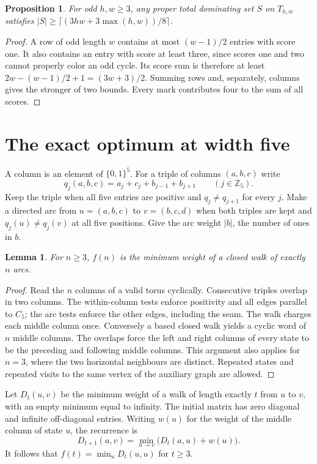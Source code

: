 \documentclass[11pt,a4paper]{article}
\newtheorem{lemma}[theorem]{Lemma}
\newtheorem{proposition}[theorem]{Proposition}
\newcommand{\T}{T}
\begin{document}
\begin{proposition}
For odd $h,w\ge3$, any proper total dominating set $S$ on $\T_{h,w}$ satisfies
$|S|\ge \lceil(3hw+3\max(h,w))/8\rceil$.
\end{proposition}
\begin{proof}
A row of odd length $w$ contains at most $(w-1)/2$ entries with score one. It also contains an entry with score at least three, since scores one and two cannot properly color an odd cycle. Its score sum is therefore at least $2w-(w-1)/2+1=(3w+3)/2$. Summing rows and, separately, columns gives the stronger of two bounds. Every mark contributes four to the sum of all scores.
\end{proof}

\clearpage
\section{The exact optimum at width five}
A column is an element of $\{0,1\}^5$. For a triple of columns $(a,b,c)$ write
\[
 q_j(a,b,c)=a_j+c_j+b_{j-1}+b_{j+1} \qquad(j\in\mathbb Z_5).
\]
Keep the triple when all five entries are positive and $q_j\ne q_{j+1}$ for every $j$. Make a directed arc from $u=(a,b,c)$ to $v=(b,c,d)$ when both triples are kept and $q_j(u)\ne q_j(v)$ at all five positions. Give the arc weight $|b|$, the number of ones in $b$.

\begin{lemma}
For $n\ge3$, $f(n)$ is the minimum weight of a closed walk of exactly $n$ arcs.
\end{lemma}
\begin{proof}
Read the $n$ columns of a valid torus cyclically. Consecutive triples overlap in two columns. The within-column tests enforce positivity and all edges parallel to $C_5$; the arc tests enforce the other edges, including the seam. The walk charges each middle column once. Conversely a based closed walk yields a cyclic word of $n$ middle columns. The overlaps force the left and right columns of every state to be the preceding and following middle columns. This argument also applies for $n=3$, where the two horizontal neighbours are distinct. Repeated states and repeated visits to the same vertex of the auxiliary graph are allowed.
\end{proof}

Let $D_t(u,v)$ be the minimum weight of a walk of length exactly $t$ from $u$ to $v$, with an empty minimum equal to infinity. The initial matrix has zero diagonal and infinite off-diagonal entries. Writing $w(u)$ for the weight of the middle column of state $u$, the recurrence is
\[
 D_{t+1}(a,v)=\min_{u\to v}\bigl(D_t(a,u)+w(u)\bigr).
\]
It follows that $f(t)=\min_u D_t(u,u)$ for $t\ge3$.
\end{document}
